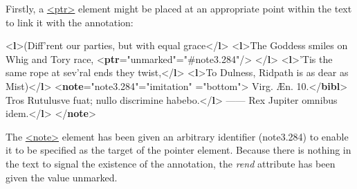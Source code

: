 Firstly, a \hyperref[TEI.ptr]{<ptr>} element might be placed at an appropriate point within the text to link it with the annotation: \par\bgroup{}\exampleFont \begin{shaded}\noindent\mbox{}{<\textbf{l}>}(Diff'rent our parties, but with equal grace{</\textbf{l}>}\mbox{}\newline 
{<\textbf{l}>}The Goddess smiles on Whig and Tory race,\mbox{}\newline 
{<\textbf{ptr}\hspace*{1em}{rend}="{unmarked}"\hspace*{1em}{target}="{\#note3.284}"/>}\mbox{}\newline 
{</\textbf{l}>}\mbox{}\newline 
{<\textbf{l}>}'Tis the same rope at sev'ral ends they twist,{</\textbf{l}>}\mbox{}\newline 
{<\textbf{l}>}To Dulness, Ridpath is as dear as Mist){</\textbf{l}>}\mbox{}\newline 
{<\textbf{note}\hspace*{1em}{xml:id}="{note3.284}"\hspace*{1em}{type}="{imitation}"\mbox{}\newline 
\hspace*{1em}{place}="{bottom}">}\mbox{}\newline 
{}Virg. Æn. 10.{</\textbf{bibl}>}\mbox{}\newline 
{}\mbox{}\newline 
\hspace*{1em}Tros Rutulusve fuat; nullo discrimine habebo.{</\textbf{l}>}\mbox{}\newline 
\hspace*{1em}—— Rex Jupiter omnibus idem.{</\textbf{l}>}\mbox{}\newline 
{}\mbox{}\newline 
{</\textbf{note}>}\end{shaded}\egroup\par \noindent   The \hyperref[TEI.note]{<note>} element has been given an arbitrary identifier (note3.284) to enable it to be specified as the target of the pointer element. Because there is nothing in the text to signal the existence of the annotation, the {\itshape rend} attribute has been given the value unmarked.\par
